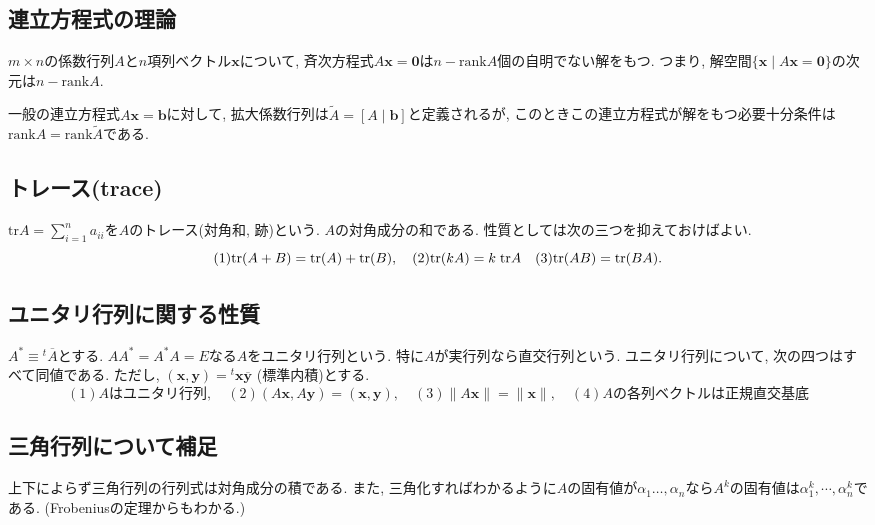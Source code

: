 \documentclass[a4j,dvipdfmx]{jsarticle}
\newcommand{\rank}{\mathrm{rank}}
\newcommand{\tr}{\mathrm{tr}}
\newcommand{\trans}{{}^t}
\theoremstyle{mystyle}
\begin{document}
        \subsection{連立方程式の理論}
            $m\times n$の係数行列$A$と$n$項列ベクトル$\bm{x}$について, 斉次方程式$A\bm{x}=\bm{0}$は$n-\rank A$個の自明でない解をもつ. つまり, 解空間$\{\bm{x}\mid A\bm{x}=\bm{0}\}$の次元は$n-\rank A$.

            一般の連立方程式$A\bm{x}=\bm{b}$に対して, 拡大係数行列は$\tilde{A}=[A \mid \bm{b}]$と定義されるが, このときこの連立方程式が解をもつ必要十分条件は$\rank A=\rank \tilde{A}$である.
        
        \subsection{トレース(trace)}
            $\displaystyle\tr A=\sum_{i=1}^{n}a_{ii}$を$A$のトレース(対角和, 跡)という. $A$の対角成分の和である. 性質としては次の三つを抑えておけばよい.
            \begin{equation*}
                (1)\tr(A+B)=\tr (A)+\tr (B),\quad (2)\tr(kA)=k\hspace{1mm}\tr A\quad (3)\tr(AB)=\tr(BA).
            \end{equation*}
        \subsection{ユニタリ行列に関する性質}
            $A^*\equiv \trans\overline{A}$とする. $AA^*=A^*A=E$なる$A$をユニタリ行列という. 特に$A$が実行列なら直交行列という. ユニタリ行列について, 次の四つはすべて同値である. ただし, $(\bm{x},\bm{y})=\trans\bm{x}\overline{\bm{y}}$ (標準内積)とする.
            \begin{equation*}
                (1)Aはユニタリ行列,\quad(2)(A\bm{x},A\bm{y})=(\bm{x},\bm{y}),\quad(3)\|A\bm{x}\|=\|\bm{x}\|,\quad(4)Aの各列ベクトルは正規直交基底
            \end{equation*}
        \subsection{三角行列について補足}
            上下によらず三角行列の行列式は対角成分の積である. また, 三角化すればわかるように$A$の固有値が$\alpha_1\dots,\alpha_n$なら$A^{k}$の固有値は$\alpha_1^k,\cdots,\alpha_n^k$である. (Frobeniusの定理からもわかる.)
\end{document}
